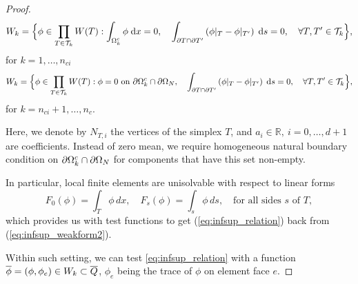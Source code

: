 \begin{proof}
\begin{equation*}
  W_k =\Big\{\phi\in \prod_{T\in \mathcal{T}_k} W(T) : 
    \int_{\Omega^c_k} \phi \; \mathrm{d} x =0,\quad
    \int_{\partial T \cap \partial T'} 
    \left( \phi|_{T} - \phi|_{T'}\right) \; \mathrm{d} s = 0,\quad \forall 
T,T'\in\mathcal{T}_k\Big\}, 
\end{equation*}
for $k=1,\dots, n_{ci}$
\begin{equation*}
  W_k =\Big\{\phi\in \prod_{T\in \mathcal{T}_k} W(T) : 
    \phi = 0 \text{ on } \partial \Omega^c_k \cap \partial \Omega_{N},\quad
    \int_{\partial T \cap \partial T'} 
    \left( \phi|_{T} - \phi|_{T'}\right) \; \mathrm{d} s = 0,\quad \forall 
T,T'\in\mathcal{T}_k\Big\}, 
\end{equation*}
for $k=n_{ci}+1,\dots, n_c$.

Here, we denote by $N_{T,i}$ the vertices of the simplex $T$, and $a_i \in \mathbb{R},\ i = 0,\dots,d+1$ are coefficients. 
Instead of zero mean, we require homogeneous natural boundary condition on 
$\partial \Omega^c_k \cap \partial \Omega_{N}$ for components that have this 
set non-empty.


In particular, local finite elements are unisolvable with respect to linear 
forms
\begin{equation*}
  F_0(\phi)=\int_T \phi\, dx,\quad F_s(\phi) = \int_{s} \phi\, ds,\quad 
\text{for all sides $s$ of $T$},
\end{equation*}
which provides us with test functions to get (\ref{eq:infsup_relation}) back 
from (\ref{eq:infsup_weakform2}). 



Within such setting, we can test \eqref{eq:infsup_relation} with a function 
$\overline\phi = (\phi, \phi_e) \in W_k \subset \overline Q$, $\phi_e$ being the trace of $\phi$ on element face $e$.



\end{proof}
